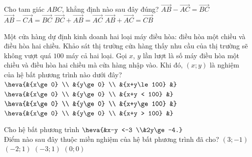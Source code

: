 \begin{ex}%
	Cho tam giác $ABC$, khẳng định nào sau đây đúng?
	\choice
	{$\overrightarrow{AB}-\overrightarrow{AC}=\overrightarrow{BC}$}
	{$\overrightarrow{AB}-\overrightarrow{CA}=\overrightarrow{BC}$}
	{\True $\overrightarrow{BC}+\overrightarrow{AB}=\overrightarrow{AC}$}
	{$\overrightarrow{AB}+\overrightarrow{AC}=\overrightarrow{CB}$}
\end{ex}
\begin{ex}%
	Một cửa hàng dự định kinh doanh hai loại máy điều hòa: điều hòa một chiều và điều hòa hai chiều. Khảo sát thị trường cửa hàng thấy nhu cầu của thị trường sẽ không vượt quá $100$ máy cả hai loại. Gọi $x$, $y$ lần lượt là số máy điều hòa một chiều và điều hòa hai chiều mà cửa hàng nhập vào. Khi đó, $(x;y)$ là nghiệm của hệ bất phương trình nào dưới đây?
	\choice
	{\True $\heva{&{x\ge 0} \\
			&{y\ge 0} \\
			&{x+y\le 100}
			&}$}
	{$\heva{&{x\ge 0} \\
			&{y\ge 0} \\
			&{x+y < 100}
			&}$}
	{$\heva{&{x\ge 0} \\
			&{y\ge 0} \\
			&{x+y\ge 100}
			&}$}
	{$\heva{&{x\ge 0} \\
			&{y\ge 0} \\
			&{x+y > 100}
			&}$}
\end{ex}
\begin{ex}%
	Cho hệ bất phương trình $\heva{&x-y <-3 \\&2y\ge-4.}$ \\
		Điểm nào sau đây thuộc miền nghiệm của hệ bất phương trình đã cho?
		\choice
		{$(3;-1)$}
		{$(-2;1)$}
		{\True $(-3;1)$}
		{$(0;0)$}
\end{ex}

